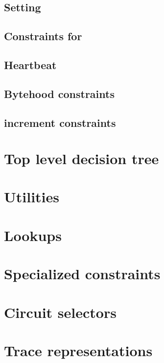 \subsection{Setting \accInputs{}}                                           \label{bls: setting acc pairings}                               
\subsection{Constraints for \blsStamp{}}                                    \label{bls: stamp}                                              
\subsection{Heartbeat}                                                      \label{bls: heartbeat}                                          
\subsection{Bytehood constraints}                                           \label{bls: bytehood and accumulator}                           
\subsection{\blsId{} increment constraints}                                 \label{bls: stamp increments}                                   

\section{Top level decision tree}                                           \label{bls: top level}                                          


\section{Utilities}                       \label{bls: utilities}                       
\section{Lookups}                         \label{bls: lookups}                         
\section{Specialized constraints}         \label{bls: specialized constraints}         
\section{Circuit selectors}               \label{bls: circuit selectors}               
\section{Trace representations}           \label{bls: trace representations}           
